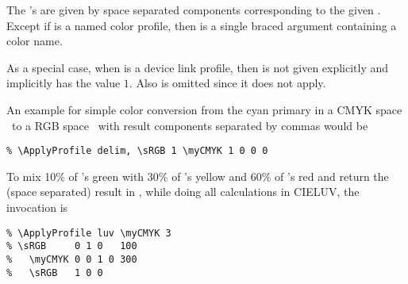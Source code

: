 \documentclass{l3doc}
\begin{document}
\begin{documentation}
\begin{function}{\ApplyProfile}
  The 's are given by space separated components corresponding to the given .
  Except if  is a named color profile, then  is a single braced argument containing a color name.

  As a special case, when  is a device link profile, then  is not given explicitly and implicitly has the value $1$. Also  is omitted since it does not apply.

  An example for simple color conversion from the cyan primary in a CMYK space \cmd\myCMYK\ to a RGB space \cmd\sRGB\ with result components separated by commas would be
\begin{verbatim}
% \ApplyProfile delim, \sRGB 1 \myCMYK 1 0 0 0
\end{verbatim}

To mix 10\% of \cmd\sRGB's green with 30\% of \cmd\myCMYK's yellow and 60\% of \cmd\sRGB's red and return the (space separated) result in \cmd\myCMYK, while doing all calculations in CIELUV, the invocation is
\begin{verbatim}
% \ApplyProfile luv \myCMYK 3
% \sRGB     0 1 0   100
%   \myCMYK 0 0 1 0 300
%   \sRGB   1 0 0
\end{verbatim}
\end{function}

\end{documentation}
\end{document}
